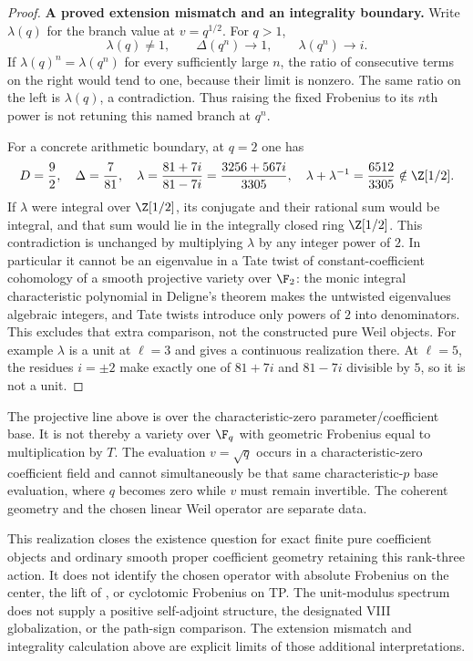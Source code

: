 \begin{proof}
\par\smallskip\noindent\textbf{A proved extension mismatch and an integrality boundary.}\quad
Write $\lambda(q)$ for the branch value at $v=q^{1/2}$.
For $q>1$,
\[
 \lambda(q)\ne1,\qquad
 \Delta(q^n)\longrightarrow1,\qquad
 \lambda(q^n)\longrightarrow i.
\]
If $\lambda(q)^n=\lambda(q^n)$ for every sufficiently
large $n$, the ratio of consecutive terms on the right
would tend to one, because their limit is nonzero.
The same ratio on the left is $\lambda(q)$, a contradiction.
Thus raising the fixed Frobenius to its $n$th power is
not retuning this named branch at $q^n$.

For a concrete arithmetic boundary, at $q=2$ one has
\[
 D=\frac92,\quad \Delta=\frac7{81},\quad
 \lambda=\frac{81+7i}{81-7i}
       =\frac{3256+567i}{3305},\quad
 \lambda+\lambda^{-1}=\frac{6512}{3305}\notin\Z[1/2].
\]
If $\lambda$ were integral over $\Z[1/2]$, its conjugate
and their rational sum would be integral, and that sum
would lie in the integrally closed ring $\Z[1/2]$.
This contradiction is unchanged by multiplying $\lambda$
by any integer power of $2$.
In particular it cannot be an eigenvalue in a Tate twist
of constant-coefficient cohomology of a smooth projective
variety over $\F_2$: the monic integral characteristic
polynomial in Deligne's theorem
\cite[Theorem~(1.6), p.~276; argument on pp.~276--277]{WeilI}
makes the untwisted eigenvalues algebraic integers, and
Tate twists introduce only powers of $2$ into denominators.
This excludes that extra comparison, not the constructed
pure Weil objects. For example $\lambda$ is a unit at
$\ell=3$ and gives a continuous realization there.
At $\ell=5$, the residues $i=\pm2$ make exactly one of
$81+7i$ and $81-7i$ divisible by $5$, so it is not a unit.
\end{proof}

The projective line above is over the characteristic-zero
parameter/coefficient base. It is not thereby a variety
over $\F_q$ with geometric Frobenius equal to multiplication
by $T$. The evaluation $v=\sqrt q$ occurs in a characteristic-zero
coefficient field and cannot simultaneously be that same
characteristic-$p$ base evaluation, where $q$ becomes zero
while $v$ must remain invertible. The coherent geometry and
the chosen linear Weil operator are separate data.

This realization closes the existence question for exact
finite pure coefficient objects and ordinary smooth proper
coefficient geometry retaining this rank-three action.
It does not identify the chosen operator with absolute
Frobenius on the center, the lift of , or cyclotomic
Frobenius on TP. The unit-modulus spectrum does not supply
a positive self-adjoint structure, the designated VIII
globalization, or the  path-sign comparison.
The extension mismatch and integrality calculation above
are explicit limits of those additional interpretations.

